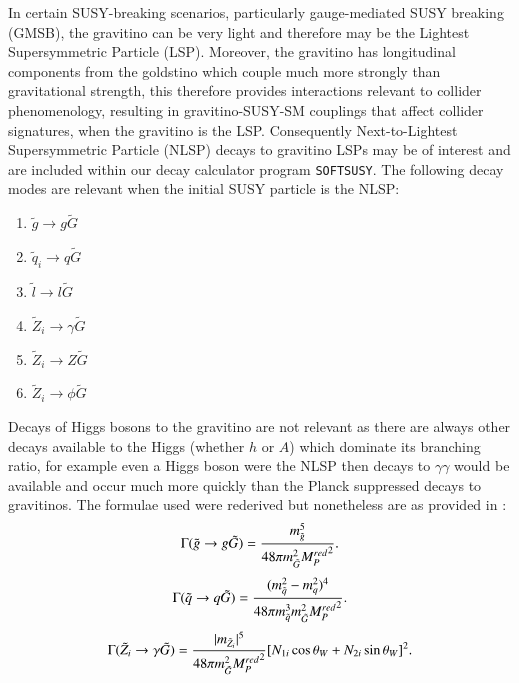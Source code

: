 \documentclass[final,3p,times,pdflatex]{elsarticle}
\begin{document}
In certain SUSY-breaking scenarios, particularly gauge-mediated SUSY breaking (GMSB), the gravitino can be very light and therefore may be the Lightest Supersymmetric Particle (LSP). Moreover, the gravitino has longitudinal components from the goldstino which couple much more strongly than gravitational strength, this therefore provides interactions relevant to collider phenomenology, resulting in gravitino-SUSY-SM couplings that affect collider signatures, when the gravitino is the LSP\@. Consequently Next-to-Lightest Supersymmetric Particle (NLSP) decays to gravitino LSPs may be of interest and are included within our decay calculator program {\tt SOFTSUSY}.
The following decay modes are relevant when the initial SUSY particle is the NLSP:
\begin{enumerate}
\item $\tilde{g} \rightarrow g \tilde{G}$
\item $\tilde{q}_{i} \rightarrow q \tilde{G}$
\item $\tilde{l} \rightarrow l \tilde{G}$
\item $\tilde{Z}_{i} \rightarrow \gamma \tilde{G}$
\item $\tilde{Z}_{i} \rightarrow Z \tilde{G}$
\item $\tilde{Z}_{i} \rightarrow \phi \tilde{G}$
\end{enumerate}
Decays of Higgs bosons to the gravitino are not relevant as there are always other decays available to the Higgs (whether $h$ or $A$) which dominate its branching ratio, for example even a Higgs boson were the NLSP then decays to $\gamma \gamma$ would be available and occur much more quickly than the Planck suppressed decays to gravitinos.
The formulae used were rederived but nonetheless are as provided in \cite{TataBaer}:
\begin{equation} \label{gluggrav}
\Gamma(\tilde{g} \rightarrow g \tilde{G}) = {m_{\tilde{g}}^5 \over 48 \pi m_{\tilde{G}}^2 {M_{P}^{red}}^2}.
\end{equation}
\begin{equation} \label{sqqgrav}
\Gamma(\tilde{q} \rightarrow q \tilde{G}) = {(m_{\tilde{q}}^2 - m_{q}^2)^4 \over 48 \pi m_{\tilde{q}}^3 m_{\tilde{G}}^2 {M_{P}^{red}}^2}.
\end{equation}
\begin{equation} \label{neutgamgrav}
\Gamma(\tilde{Z}_i \rightarrow \gamma \tilde{G}) = {|m_{\tilde{Z}_i}|^5 \over 48 \pi m_{\tilde{G}}^2 {M_{P}^{red}}^2}[N_{1i}\cos\theta_W + N_{2i}\sin\theta_W]^2.
\end{equation}
\end{document}
